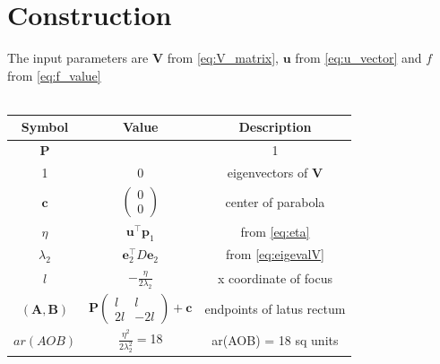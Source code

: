 \documentclass[journal,10pt,twocolumn]{article}
\let\vec\mathbf
\newcommand{\myvec}[1]{\ensuremath{\begin{pmatrix}#1\end{pmatrix}}}
\begin{document}
\section*{\large Construction}
The input parameters are $\vec{V}$ from \eqref{eq:V_matrix}, $\vec{u}$ from \eqref{eq:u_vector} and $f$ from \eqref{eq:f_value}\\\\
{
\setlength\extrarowheight{5pt}
\begin{tabular}{|c|c|c|}
	\hline
	\textbf{Symbol}&\textbf{Value}&\textbf{Description}\\
	\hline
	$\vec{P}$&\myvec{0&1\\1&0}&eigenvectors of $\vec{V}$\\[5pt]
	\hline
	$\vec{c}$&$\myvec{0\\0}$&center of parabola\\
	\hline
	$\eta$&$\vec{u}^{\top}\vec{p}_1$&from \eqref{eq:eta}\\[5pt]
	\hline
	$\lambda_2$&$\vec{e}_2^{\top}D\vec{e}_2$&from \eqref{eq:eigevalV}\\[5pt]
	\hline
	$l$&$-\frac{\eta}{2\lambda_2}$&x coordinate of focus\\[5pt]
	\hline
	$(\vec{A},\vec{B})$&$\vec{P}\myvec{l&l\\2l&-2l} + \vec{c}$&endpoints of latus rectum\\[5pt]
	\hline
	$ar(AOB)$&$\frac{\eta^2}{2\lambda_2^2} = $18&ar(AOB) = 18 sq units\\[5pt]
	\hline
\end{tabular}
}
\end{document}
